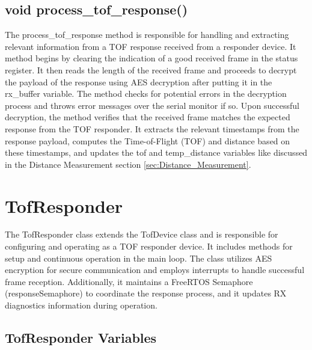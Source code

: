 \subsection{void process\_tof\_response()}
\label{subsec:TofInitiator_process_tof_response}
The process\_tof\_response method is responsible for handling and extracting relevant information from a TOF response received from a responder device. 
It method begins by clearing the indication of a good received frame in the status register. It then reads the length of the received frame and proceeds to decrypt the payload of the response using AES decryption after putting it in the rx\_buffer variable. 
The method checks for potential errors in the decryption process and throws error messages over the serial monitor if so. 
\vspace{4pt}
\newline
Upon successful decryption, the method verifies that the received frame matches the expected response from the TOF responder. It extracts the relevant timestamps from the response payload, computes the Time-of-Flight (TOF) and distance based on these timestamps, and updates the tof and temp\_distance variables like discussed in the Distance Measurement section \ref{sec:Distance_Measurement}. 

\section{TofResponder}
\label{sec:TofResponder}
The TofResponder class extends the TofDevice class and is responsible for configuring and operating as a TOF responder device. 
It includes methods for setup and continuous operation in the main loop. 
The class utilizes AES encryption for secure communication and employs interrupts to handle successful frame reception. 
Additionally, it maintains a FreeRTOS Semaphore (responseSemaphore) to coordinate the response process, and it updates RX diagnostics information during operation.

\subsection{TofResponder Variables}
\label{subsec:TofResponder_Variables}
